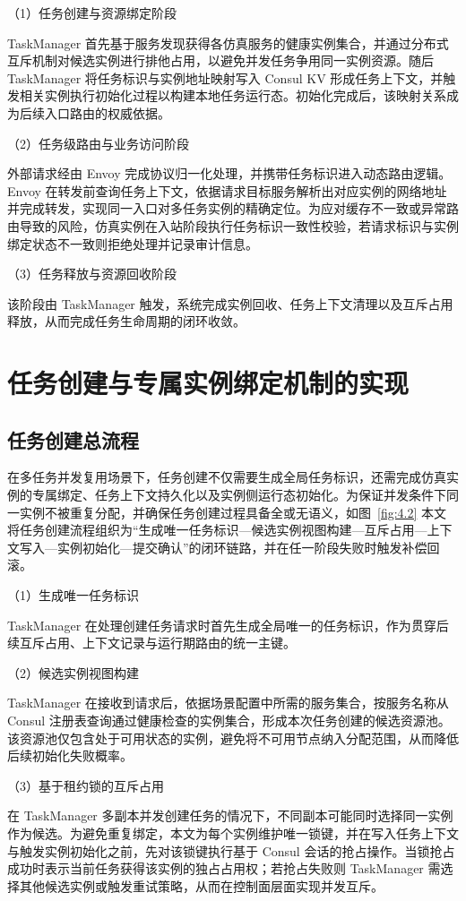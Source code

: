 \documentclass[lang=chs, degree=master, blindreview=true, winfonts=true, academic=false]{yanputhesis}
\begin{document}
（1）任务创建与资源绑定阶段

TaskManager 首先基于服务发现获得各仿真服务的健康实例集合，并通过分布式互斥机制对候选实例进行排他占用，以避免并发任务争用同一实例资源。随后 TaskManager 将任务标识与实例地址映射写入 Consul KV 形成任务上下文，并触发相关实例执行初始化过程以构建本地任务运行态。初始化完成后，该映射关系成为后续入口路由的权威依据。

（2）任务级路由与业务访问阶段

外部请求经由 Envoy 完成协议归一化处理，并携带任务标识进入动态路由逻辑。Envoy 在转发前查询任务上下文，依据请求目标服务解析出对应实例的网络地址并完成转发，实现同一入口对多任务实例的精确定位。为应对缓存不一致或异常路由导致的风险，仿真实例在入站阶段执行任务标识一致性校验，若请求标识与实例绑定状态不一致则拒绝处理并记录审计信息。

（3）任务释放与资源回收阶段

该阶段由 TaskManager 触发，系统完成实例回收、任务上下文清理以及互斥占用释放，从而完成任务生命周期的闭环收敛。

\section{任务创建与专属实例绑定机制的实现}
\subsection{任务创建总流程}
在多任务并发复用场景下，任务创建不仅需要生成全局任务标识，还需完成仿真实例的专属绑定、任务上下文持久化以及实例侧运行态初始化。为保证并发条件下同一实例不被重复分配，并确保任务创建过程具备全或无语义，如图~\ref{fig:4.2} 本文将任务创建流程组织为“生成唯一任务标识—候选实例视图构建—互斥占用—上下文写入—实例初始化—提交确认”的闭环链路，并在任一阶段失败时触发补偿回滚。

（1）生成唯一任务标识

TaskManager 在处理创建任务请求时首先生成全局唯一的任务标识，作为贯穿后续互斥占用、上下文记录与运行期路由的统一主键。

（2）候选实例视图构建

TaskManager 在接收到请求后，依据场景配置中所需的服务集合，按服务名称从 Consul 注册表查询通过健康检查的实例集合，形成本次任务创建的候选资源池。该资源池仅包含处于可用状态的实例，避免将不可用节点纳入分配范围，从而降低后续初始化失败概率。

（3）基于租约锁的互斥占用

在 TaskManager 多副本并发创建任务的情况下，不同副本可能同时选择同一实例作为候选。为避免重复绑定，本文为每个实例维护唯一锁键，并在写入任务上下文与触发实例初始化之前，先对该锁键执行基于 Consul 会话的抢占操作。当锁抢占成功时表示当前任务获得该实例的独占占用权；若抢占失败则 TaskManager 需选择其他候选实例或触发重试策略，从而在控制面层面实现并发互斥。
\end{document}
